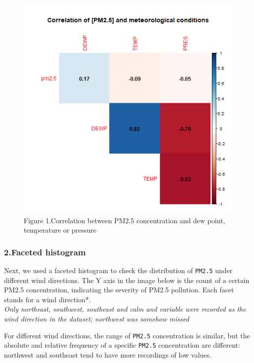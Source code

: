 \documentclass[]{article}
\begin{document}
\begin{figure}
\centering
\includegraphics{../images/corr.png}
\caption{Figure 1.Correlation between PM2.5 concentration and dew point,
temperature or pressure}
\end{figure}

\hypertarget{faceted-histogram}{%
\subsubsection{2.Faceted histogram}\label{faceted-histogram}}

Next, we used a faceted histogram to check the distribution of
\texttt{PM2.5} under different wind directions. The Y axis in the image
below is the count of a certain PM2.5 concentration, indicating the
severity of PM2.5 pollution. Each facet stands for a wind direction*.\\
\emph{Only northeast, southwest, southeast and calm and variable were
recorded as the wind direction in the dataset; northwest was somehow
missed}

For different wind directions, the range of \texttt{PM2.5} concentration
is similar, but the absolute and relative frequency of a specific
\texttt{PM2.5} concentration are different: northwest and southeast tend
to have more recordings of low values.
\end{document}
